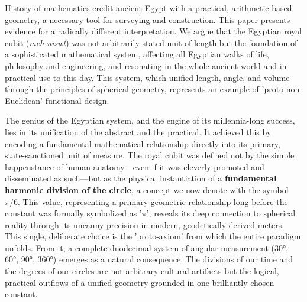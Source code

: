 \documentclass[11pt]{article}
\begin{document}
History of mathematics credit ancient Egypt with a practical, arithmetic-based geometry, a necessary tool for surveying and construction. This paper presents evidence for a radically different interpretation. We argue that the Egyptian royal cubit (\textit{meh niswt}) was not arbitrarily stated unit of length but the foundation of a sophisticated mathematical system, affecting all Egyptian walks of life, philosophy and engineering, and resonating in the whole ancient world and in practical use to this day. This system, which unified length, angle, and volume through the principles of spherical geometry, represents an example of 'proto-non-Euclidean' functional design.

The genius of the Egyptian system, and the engine of its millennia-long success, lies in its unification of the abstract and the practical. It achieved this by encoding a fundamental mathematical relationship directly into its primary, state-sanctioned unit of measure. The royal cubit was defined not by the simple happenstance of human anatomy—even if it was cleverly promoted and disseminated as such—but as the physical instantiation of a \textbf{fundamental harmonic division of the circle}, a concept we now denote with the symbol $\pi/6$. This value, representing a primary geometric relationship long before the constant was formally symbolized as '$\pi$', reveals its deep connection to spherical reality through its uncanny precision in modern, geodetically-derived meters. This single, deliberate choice is the 'proto-axiom' from which the entire paradigm unfolds. From it, a complete duodecimal system of angular measurement (30°, 60°, 90°, 360°) emerges as a natural consequence. The divisions of our time and the degrees of our circles are not arbitrary cultural artifacts but the logical, practical outflows of a unified geometry grounded in one brilliantly chosen constant.
\end{document}
